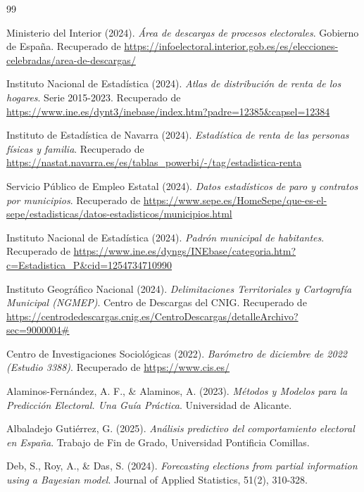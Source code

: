 \begin{thebibliography}{99}

Ministerio del Interior (2024). \textit{Área de descargas de procesos electorales}. Gobierno de España. Recuperado de \url{https://infoelectoral.interior.gob.es/es/elecciones-celebradas/area-de-descargas/}

Instituto Nacional de Estadística (2024). \textit{Atlas de distribución de renta de los hogares}. Serie 2015-2023. Recuperado de \url{https://www.ine.es/dynt3/inebase/index.htm?padre=12385&capsel=12384}

Instituto de Estadística de Navarra (2024). \textit{Estadística de renta de las personas físicas y familia}. Recuperado de \url{https://nastat.navarra.es/es/tablas_powerbi/-/tag/estadistica-renta}

Servicio Público de Empleo Estatal (2024). \textit{Datos estadísticos de paro y contratos por municipios}. Recuperado de \url{https://www.sepe.es/HomeSepe/que-es-el-sepe/estadisticas/datos-estadisticos/municipios.html}

Instituto Nacional de Estadística (2024). \textit{Padrón municipal de habitantes}. Recuperado de \url{https://www.ine.es/dyngs/INEbase/categoria.htm?c=Estadistica_P&cid=1254734710990}

Instituto Geográfico Nacional (2024). \textit{Delimitaciones Territoriales y Cartografía Municipal (NGMEP)}. Centro de Descargas del CNIG. Recuperado de \url{https://centrodedescargas.cnig.es/CentroDescargas/detalleArchivo?sec=9000004#}

Centro de Investigaciones Sociológicas (2022). \textit{Barómetro de diciembre de 2022 (Estudio 3388)}. Recuperado de \url{https://www.cis.es/}


Alaminos-Fernández, A. F., \& Alaminos, A. (2023). \textit{Métodos y Modelos para la Predicción Electoral. Una Guía Práctica}. Universidad de Alicante.

Albaladejo Gutiérrez, G. (2025). \textit{Análisis predictivo del comportamiento electoral en España}. Trabajo de Fin de Grado, Universidad Pontificia Comillas.

Deb, S., Roy, A., \& Das, S. (2024). \textit{Forecasting elections from partial information using a Bayesian model}. Journal of Applied Statistics, 51(2), 310-328.


\end{thebibliography}
